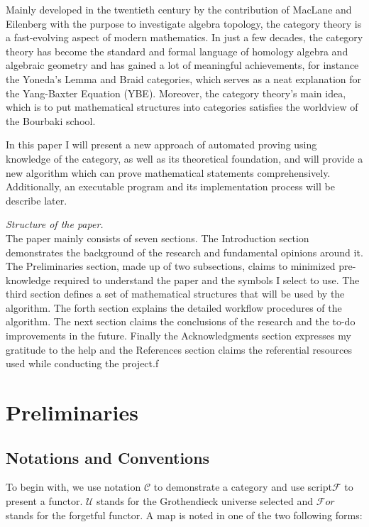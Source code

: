 \documentclass{article}
\begin{document}
Mainly developed in the twentieth century by the contribution of MacLane and Eilenberg with the purpose to investigate algebra topology, the category theory is a fast-evolving aspect of modern mathematics. In just a few decades, the category theory has become the standard and formal language of homology algebra and algebraic geometry and has gained a lot of meaningful achievements, for instance the Yoneda{'}s Lemma and Braid categories, which serves as a neat explanation for the Yang-Baxter Equation (YBE). Moreover, the category theory{'}s main idea, which is to put mathematical structures into categories satisfies the worldview of the Bourbaki school.

In this paper I will present a new approach of automated proving using knowledge of the category, as well as its theoretical foundation, and will provide a new algorithm which can prove mathematical statements comprehensively. Additionally, an executable program and its implementation process will be describe later.

\textit{ Structure of the paper.}\\
The paper mainly consists of seven sections. The Introduction section demonstrates the background of the research and fundamental opinions around it. The Preliminaries section, made up of two subsections, claims to minimized pre-knowledge required to understand the paper and the symbols I select to use. The third section defines a set of mathematical structures that will be used by the algorithm. The forth section explains the detailed workflow procedures of the algorithm. The next section claims the conclusions of the research and the to-do improvements in the future. Finally the Acknowledgments section expresses my gratitude to the help and the References section claims the referential resources used while conducting the project.f

\section*{Preliminaries}

\subsection*{Notations and Conventions}

To begin with, we use notation \(\mathcal{C}\) to demonstrate a category and use script\(\mathcal{F}\) to present a functor. \(\mathcal{U}\) stands for the Grothendieck universe selected and \(\mathcal{F}\mathit{o}\mathit{r}\) stands for the forgetful functor. A map is noted in one of the two following forms:
\end{document}
